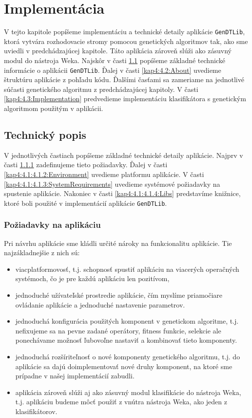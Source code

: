 \chapter{Implementácia}
V tejto kapitole popíšeme implementáciu a technické detaily aplikácie \verb|GenDTLib|, ktorá vytvára rozhodovacie stromy pomocou genetických algoritmov tak, ako sme uviedli v predchádzajúcej kapitole. Táto aplikácia zároveň slúži ako zásuvný modul do nástroja Weka. Najskôr v časti \ref{kap4:4.1:Info} popíšeme základné technické informácie o aplikácii \verb|GenDTLib|. Ďalej v časti \ref{kap4:4.2:About} uvedieme štruktúru aplikácie z pohľadu kódu. Ďalšími časťami sa zameriame na jednotlivé súčasti genetického algoritmu z predchádzajúcej kapitoly. V časti \ref{kap4:4.3:Implementation} predvedieme implementáciu klasifikátora s genetickým algoritmom použitým v aplikácii.
\section{Technický popis}\label{kap4:4.1:Info}
V jednotlivých častiach popíšeme základné technické detaily aplikácie. Najprv v časti \ref{kap4:4.1:4.1.1:Requirements} zadefinujeme tieto požiadavky. Ďalej v časti \ref{kap4:4.1:4.1.2:Environment} uvedieme platformu aplikácie. V časti \ref{kap4:4.1:4.1.3:SystemRequirements} uvedieme systémové požiadavky na spustenie aplikácie. Nakoniec v časti \ref{kap4:4.1:4.1.4:Libs} predstavíme knižnice, ktoré boli použité v implementácií aplikácie \verb|GenDTLib|.

\subsection{Požiadavky na aplikáciu}\label{kap4:4.1:4.1.1:Requirements}
Pri návrhu aplikácie sme kládli určité nároky na funkcionalitu aplikácie. Tie najzákladnejšie z nich sú:
\begin{itemize}
\item viacplatformovosť, t.j. schopnosť spustiť aplikáciu na viacerých operačných systémoch, čo je pre každú aplikáciu len pozitívom,
\item jednoduché užívateľské prostredie aplikácie, čím myslíme priamočiare ovládanie aplikácie a jednoduché nastavenie parametrov.
\item jednoduchá konfigurácia použitých komponent v genetickom algoritme, t.j. nefixujeme sa na pevne zadané operátory, fitness funkcie, selekcie ale ponechávame možnosť ľubovoľne nastaviť a kombinovať tieto komponenty.
\item jednoduchá rozšíriteľnosť o nové komponenty genetického algoritmu, t.j. do aplikácie sa dajú doimplementovať nové druhy komponent, na ktoré sme prípadne v našej implementácií zabudli. 
\item aplikácia zároveň slúži aj ako zásuvný modul klasifikácie do nástroja Weka, t.j. aplikáciu budeme môcť použiť z vnútra nástroja Weka, ako jeden z klasifikátorov. 
\end{itemize}

